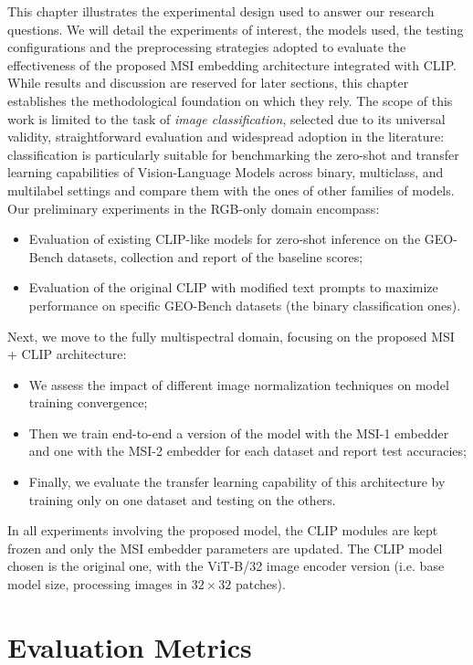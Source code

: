 \documentclass[a4paper, twoside, english]{sapthesis} %
\begin{document}
This chapter illustrates the experimental design used to answer our research questions. We will detail the experiments of interest, the models used, the testing configurations and the preprocessing strategies adopted to evaluate the effectiveness of the proposed MSI embedding architecture integrated with CLIP. While results and discussion are reserved for later sections, this chapter establishes the methodological foundation on which they rely.
The scope of this work is limited to the task of \emph{image classification}, selected due to its universal validity, straightforward evaluation and widespread adoption in the literature: classification is particularly suitable for benchmarking the zero-shot and transfer learning capabilities of Vision-Language Models across binary, multiclass, and multilabel settings and compare them with the ones of other families of models. Our preliminary experiments in the RGB-only domain encompass:
\begin{itemize}
    \item Evaluation of existing CLIP-like models for zero-shot inference on the GEO-Bench datasets, collection and report of the baseline scores;
    \item Evaluation of the original CLIP with modified text prompts to maximize performance on specific GEO-Bench datasets (the binary classification ones).
\end{itemize}
Next, we move to the fully multispectral domain, focusing on the proposed MSI + CLIP architecture:
\begin{itemize}
    \item We assess the impact of different image normalization techniques on model training convergence;
    \item Then we train end-to-end a version of the model with the MSI-1 embedder and one with the MSI-2 embedder for each dataset and report test accuracies;
    \item Finally, we evaluate the transfer learning capability of this architecture by training only on one dataset and testing on the others.
\end{itemize}  
In all experiments involving the proposed model, the CLIP modules are kept frozen and only the MSI embedder parameters are updated. The CLIP model chosen is the original one, with the ViT-B/32 image encoder version (i.e. base model size, processing images in $32\times32$ patches).


\section{Evaluation Metrics}
\end{document}
